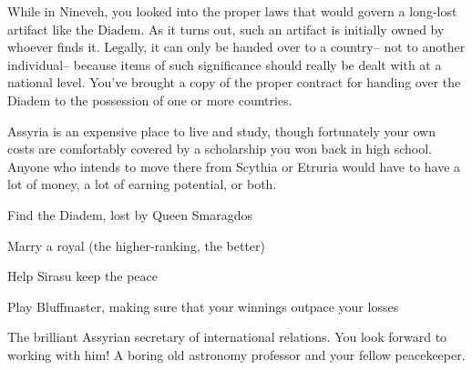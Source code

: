 \documentclass[char]{Kos}
\begin{document}
\begin{itemz}[Notes]
  \item While in Nineveh, you looked into the proper laws that would govern a long-lost artifact like the Diadem. As it turns out, such an artifact is initially owned by whoever finds it. Legally, it can only be handed over to a country-- not to another individual-- because items of such significance should really be dealt with at a national level. You've brought a copy of the proper contract for handing over the Diadem to the possession of one or more countries.
  \item Assyria is an expensive place to live and study, though fortunately your own costs are comfortably covered by a scholarship you won back in high school. Anyone who intends to move there from Scythia or Etruria would have to have a lot of money, a lot of earning potential, or both.
  \end{itemz}

\begin{itemz}[Goals]
\item Find the Diadem, lost by Queen Smaragdos
\item Marry a royal (the higher-ranking, the better)
\item Help Sirasu keep the peace
\item Play Bluffmaster, making sure that your winnings outpace your losses
\end{itemz}

\begin{contacts}
 The brilliant Assyrian secretary of international relations. You look forward to working with him!
\contact{\cAnarchist{}} A boring old astronomy professor and your fellow peacekeeper.
\end{contacts}
\end{document}
